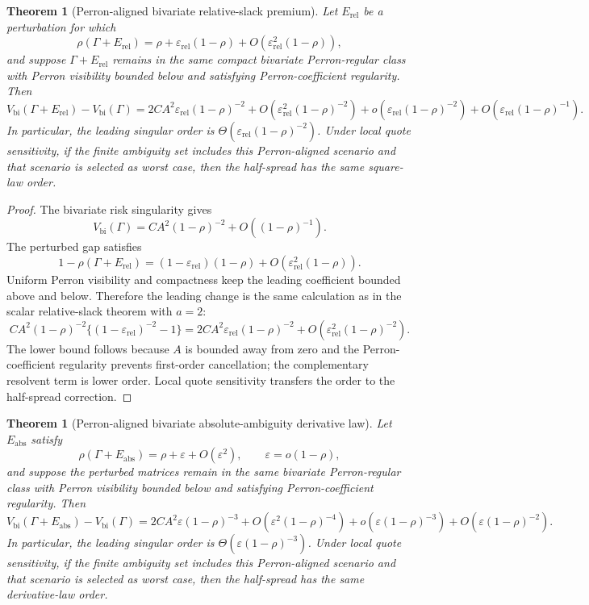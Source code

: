 \documentclass[11pt]{article}
\newtheorem{theorem}[assumption]{Theorem}
\newcommand{\eps}{\varepsilon}
\begin{document}
\begin{theorem}[Perron-aligned bivariate relative-slack premium]
Let $E_{\mathrm{rel}}$ be a perturbation for which
\[
\rho(\Gamma+E_{\mathrm{rel}})
=
\rho+\eps_{\mathrm{rel}}(1-\rho)+O(\eps_{\mathrm{rel}}^2(1-\rho)),
\]
and suppose $\Gamma+E_{\mathrm{rel}}$ remains in the same compact bivariate
Perron-regular class with Perron visibility bounded below and satisfying
Perron-coefficient regularity. Then
\[
V_{\mathrm{bi}}(\Gamma+E_{\mathrm{rel}})
-V_{\mathrm{bi}}(\Gamma)
=
2CA^2\eps_{\mathrm{rel}}(1-\rho)^{-2}
+O(\eps_{\mathrm{rel}}^2(1-\rho)^{-2})
+o(\eps_{\mathrm{rel}}(1-\rho)^{-2})
+O(\eps_{\mathrm{rel}}(1-\rho)^{-1}).
\]
In particular, the leading singular order is
$\Theta(\eps_{\mathrm{rel}}(1-\rho)^{-2})$. Under local quote sensitivity, if
the finite ambiguity set includes this Perron-aligned scenario and that scenario
is selected as worst case, then the half-spread has the same square-law order.
\end{theorem}

\begin{proof}
The bivariate risk singularity gives
\[
V_{\mathrm{bi}}(\Gamma)=C A^2(1-\rho)^{-2}+O((1-\rho)^{-1}).
\]
The perturbed gap satisfies
\[
1-\rho(\Gamma+E_{\mathrm{rel}})
=(1-\eps_{\mathrm{rel}})(1-\rho)+O(\eps_{\mathrm{rel}}^2(1-\rho)).
\]
Uniform Perron visibility and compactness keep the leading coefficient bounded
above and below. Therefore the leading change is the same calculation as in the
scalar relative-slack theorem with $a=2$:
\[
C A^2(1-\rho)^{-2}\{(1-\eps_{\mathrm{rel}})^{-2}-1\}
=
2 C A^2\eps_{\mathrm{rel}}(1-\rho)^{-2}
+O(\eps_{\mathrm{rel}}^2(1-\rho)^{-2}).
\]
The lower bound follows because $A$ is bounded away from zero and the
Perron-coefficient regularity prevents first-order cancellation; the
complementary resolvent term is lower order. Local quote sensitivity transfers
the order to the half-spread correction.
\end{proof}

\begin{theorem}[Perron-aligned bivariate absolute-ambiguity derivative law]
Let $E_{\mathrm{abs}}$ satisfy
\[
\rho(\Gamma+E_{\mathrm{abs}})
=\rho+\eps+O(\eps^2),
\qquad \eps=o(1-\rho),
\]
and suppose the perturbed matrices remain in the same bivariate Perron-regular
class with Perron visibility bounded below and satisfying Perron-coefficient
regularity. Then
\[
V_{\mathrm{bi}}(\Gamma+E_{\mathrm{abs}})
-V_{\mathrm{bi}}(\Gamma)
=
2CA^2\eps(1-\rho)^{-3}
+O(\eps^2(1-\rho)^{-4})
+o(\eps(1-\rho)^{-3})
+O(\eps(1-\rho)^{-2}).
\]
In particular, the leading singular order is
$\Theta(\eps(1-\rho)^{-3})$. Under local quote sensitivity, if the finite
ambiguity set includes this Perron-aligned scenario and that scenario is
selected as worst case, then the half-spread has the same derivative-law order.
\end{theorem}
\end{document}
